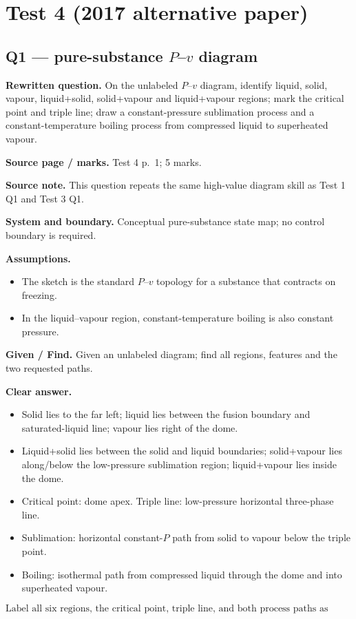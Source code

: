 \section*{Test 4 (2017 alternative paper)}

\subsection*{Q1 --- pure-substance $P$--$v$ diagram}
\textbf{Rewritten question.} On the unlabeled $P$--$v$ diagram, identify liquid, solid, vapour, liquid+solid, solid+vapour and liquid+vapour regions; mark the critical point and triple line; draw a constant-pressure sublimation process and a constant-temperature boiling process from compressed liquid to superheated vapour.

\textbf{Source page / marks.} Test 4 p.~1; 5 marks.

\textbf{Source note.} This question repeats the same high-value diagram skill as Test 1 Q1 and Test 3 Q1.

\textbf{System and boundary.} Conceptual pure-substance state map; no control boundary is required.

\textbf{Assumptions.}
\begin{itemize}
  \item The sketch is the standard $P$--$v$ topology for a substance that contracts on freezing.
  \item In the liquid--vapour region, constant-temperature boiling is also constant pressure.
\end{itemize}

\textbf{Given / Find.} Given an unlabeled diagram; find all regions, features and the two requested paths.


\textbf{Clear answer.}
\begin{itemize}
  \item Solid lies to the far left; liquid lies between the fusion boundary and saturated-liquid line; vapour lies right of the dome.
  \item Liquid+solid lies between the solid and liquid boundaries; solid+vapour lies along/below the low-pressure sublimation region; liquid+vapour lies inside the dome.
  \item Critical point: dome apex. Triple line: low-pressure horizontal three-phase line.
  \item Sublimation: horizontal constant-$P$ path from solid to vapour below the triple point.
  \item Boiling: isothermal path from compressed liquid through the dome and into superheated vapour.
\end{itemize}
\[
\boxed{\text{Label all six regions, the critical point, triple line, and both process paths as shown.}}
\]

